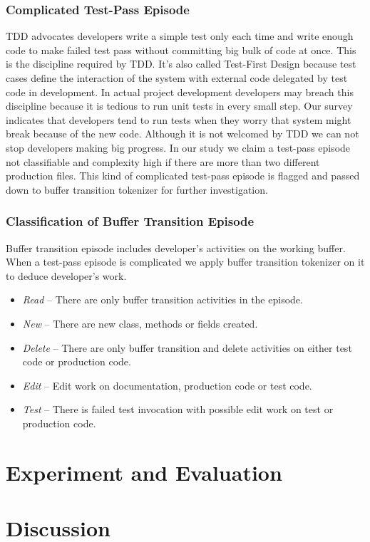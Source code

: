 \documentclass[11pt,twocolumn]{article}
\begin{document}
\subsubsection{Complicated Test-Pass Episode}
TDD advocates developers write a simple test only each time and write
enough code to make failed test pass without committing big bulk of code at
once. This is the discipline required by TDD. It's also called Test-First
Design because test cases define the interaction of the system with
external code delegated by test code in development. In actual project
development developers may breach this discipline because it is tedious to
run unit tests in every small step. Our survey indicates that developers
tend to run tests when they worry that system might break because of the
new code. Although it is not welcomed by TDD we can not stop developers
making big progress. In our study we claim a test-pass episode not
classifiable and complexity high if there are more than two different
production files. This kind of complicated test-pass episode is flagged and
passed down to buffer transition tokenizer for further investigation.

\subsubsection{Classification of Buffer Transition Episode}
Buffer transition episode includes developer's activities on the working
buffer. When a test-pass episode is complicated we apply buffer transition
tokenizer on it to deduce developer's work.
\begin{itemize}
\item \textit{Read} -- There are only buffer transition activities in the
  episode.
\item \textit{New} -- There are new class, methods or fields created.
\item \textit{Delete} -- There are only buffer transition and delete
  activities on either test code or production code.
\item \textit{Edit} -- Edit work on documentation, production code or test
  code.
\item \textit{Test} -- There is failed test invocation with possible edit
  work on test or production code.
\end{itemize}

\section{Experiment and Evaluation}
\label{sec:exp}

\section{Discussion}
\label{sec:disc}



\end{document}
